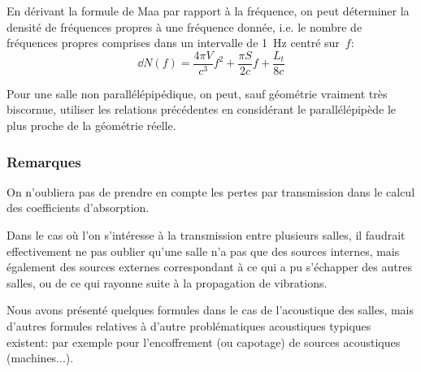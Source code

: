 En dérivant la formule de Maa par rapport à la fréquence, on peut déterminer la
densité de fréquences propres à une fréquence donnée, i.e. le nombre de fréquences propres comprises dans un intervalle de 1~Hz centré sur~$f$:
\begin{equation}
\dd N(f) = \frac{4\pi V}{c^3}f^2 + \frac{\pi S}{2c}f + \frac{L_t}{8c}
\end{equation}

Pour une salle non parallélépipédique, on peut, sauf géométrie vraiment très biscornue, utiliser les relations précédentes en considérant le parallélépipède le plus proche de la géométrie réelle.

\medskip
\subsubsection{Remarques}

On n'oubliera pas de prendre en compte les pertes par transmission dans le calcul des coefficients d'absorption.

\medskip
Dans le cas où l'on s'intéresse à la transmission entre plusieurs salles, il faudrait effectivement ne pas oublier qu'une salle n'a pas que des sources internes, mais également des sources externes correspondant à ce qui a pu s'échapper des autres salles, ou de ce qui rayonne suite à la propagation de vibrations.

\medskip
Nous avons présenté quelques formules dans le cas de l'acoustique des salles, mais d'autres formules relatives à d'autre problématiques acoustiques typiques existent: par exemple pour l'encoffrement (ou capotage) de sources acoustiques (machines...).

